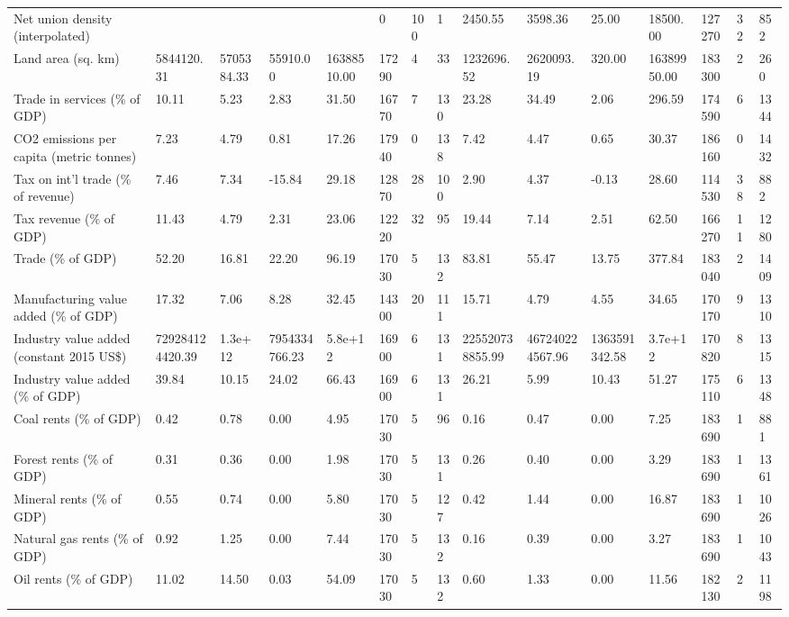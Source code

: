 \begin{longtable}{lllllllllllllll}
Net union density (interpolated) &  &  &  &  & 0 & 100 & 1 & 2450.55 & 3598.36 & 25.00 & 18500.00 & 127270 & 32 & 852\\
Land area (sq. km) & 5844120.31 & 5705384.33 & 55910.00 & 16388510.00 & 17290 & 4 & 33 & 1232696.52 & 2620093.19 & 320.00 & 16389950.00 & 183300 & 2 & 260\\
Trade in services (\% of GDP) & 10.11 & 5.23 & 2.83 & 31.50 & 16770 & 7 & 130 & 23.28 & 34.49 & 2.06 & 296.59 & 174590 & 6 & 1344\\
\addlinespace
CO2 emissions per capita (metric tonnes) & 7.23 & 4.79 & 0.81 & 17.26 & 17940 & 0 & 138 & 7.42 & 4.47 & 0.65 & 30.37 & 186160 & 0 & 1432\\
Tax on int'l trade (\% of revenue) & 7.46 & 7.34 & -15.84 & 29.18 & 12870 & 28 & 100 & 2.90 & 4.37 & -0.13 & 28.60 & 114530 & 38 & 882\\
Tax revenue (\% of GDP) & 11.43 & 4.79 & 2.31 & 23.06 & 12220 & 32 & 95 & 19.44 & 7.14 & 2.51 & 62.50 & 166270 & 11 & 1280\\
Trade (\% of GDP) & 52.20 & 16.81 & 22.20 & 96.19 & 17030 & 5 & 132 & 83.81 & 55.47 & 13.75 & 377.84 & 183040 & 2 & 1409\\
Manufacturing value added (\% of GDP) & 17.32 & 7.06 & 8.28 & 32.45 & 14300 & 20 & 111 & 15.71 & 4.79 & 4.55 & 34.65 & 170170 & 9 & 1310\\
\addlinespace
Industry value added (constant 2015 US\$) & 729284124420.39 & 1.3e+12 & 7954334766.23 & 5.8e+12 & 16900 & 6 & 131 & 225520738855.99 & 467240224567.96 & 1363591342.58 & 3.7e+12 & 170820 & 8 & 1315\\
Industry value added (\% of GDP) & 39.84 & 10.15 & 24.02 & 66.43 & 16900 & 6 & 131 & 26.21 & 5.99 & 10.43 & 51.27 & 175110 & 6 & 1348\\
Coal rents (\% of GDP) & 0.42 & 0.78 & 0.00 & 4.95 & 17030 & 5 & 96 & 0.16 & 0.47 & 0.00 & 7.25 & 183690 & 1 & 881\\
Forest rents (\% of GDP) & 0.31 & 0.36 & 0.00 & 1.98 & 17030 & 5 & 131 & 0.26 & 0.40 & 0.00 & 3.29 & 183690 & 1 & 1361\\
Mineral rents (\% of GDP) & 0.55 & 0.74 & 0.00 & 5.80 & 17030 & 5 & 127 & 0.42 & 1.44 & 0.00 & 16.87 & 183690 & 1 & 1026\\
\addlinespace
Natural gas rents (\% of GDP) & 0.92 & 1.25 & 0.00 & 7.44 & 17030 & 5 & 132 & 0.16 & 0.39 & 0.00 & 3.27 & 183690 & 1 & 1043\\
Oil rents (\% of GDP) & 11.02 & 14.50 & 0.03 & 54.09 & 17030 & 5 & 132 & 0.60 & 1.33 & 0.00 & 11.56 & 182130 & 2 & 1198\\

\end{longtable}
